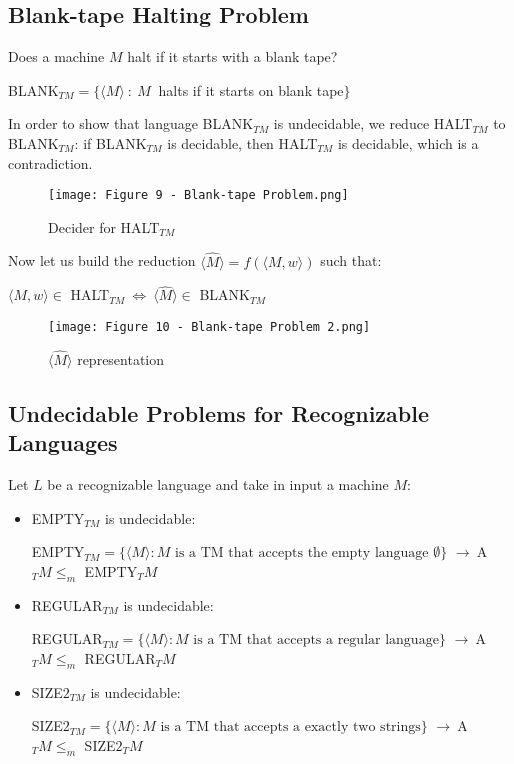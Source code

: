 \documentclass{article}
\begin{document}
\subsection{Blank-tape Halting Problem}
Does a machine $M$ halt if it starts with a blank tape?
\begin{center}
    BLANK$_{TM} = \{\langle M\rangle \ : \ M \ $ halts if it starts on blank tape$\}$
\end{center}
In order to show that language BLANK$_{TM}$ is undecidable, we reduce HALT$_{TM}$ to BLANK$_{TM}$: if BLANK$_{TM}$ is decidable, then HALT$_{TM}$ is decidable, which is a contradiction.
\begin{figure}[H]
    \centering
    \texttt{[image: Figure 9 - Blank-tape Problem.png]}
    \caption{Decider for HALT$_{TM}$}
\end{figure}
Now let us build the reduction $\langle \hat{M}\rangle= f(\langle M,w\rangle)$ such that:
\begin{center}
    $\langle M,w\rangle \in$ HALT$_{TM} \ \Longleftrightarrow \ \langle \hat{M}\rangle \in $ BLANK$_{TM}$ 
\end{center}
\begin{figure}[H]
    \centering
    \texttt{[image: Figure 10 - Blank-tape Problem 2.png]}
    \caption{$\langle\hat{M}\rangle$ representation}
\end{figure}
\subsection{Undecidable Problems for Recognizable Languages}
Let $L$ be a recognizable language and take in input a machine $M$:
\begin{itemize}
    \item EMPTY$_{TM}$ is undecidable:
        \begin{center}
            EMPTY$_{TM} = \{\langle M\rangle : M \text{ is a TM that accepts the empty language } \emptyset\}$ $ \rightarrow \ $A$_TM \leq_m$ EMPTY$_TM$ 
        \end{center}
    \item REGULAR$_{TM}$ is undecidable:
        \begin{center}
            REGULAR$_{TM} = \{\langle M\rangle : M \text{ is a TM that accepts a regular language}\}$ $ \rightarrow \ $A$_TM \leq_m$ REGULAR$_TM$ 
        \end{center}
    \item SIZE$2_{TM}$ is undecidable:
        \begin{center}
            SIZE$2_{TM} = \{\langle M\rangle : M \text{ is a TM that accepts a exactly two strings}\}$ $ \rightarrow \ $A$_TM \leq_m$ SIZE$2_TM$ 
        \end{center}
\end{itemize}
\end{document}
